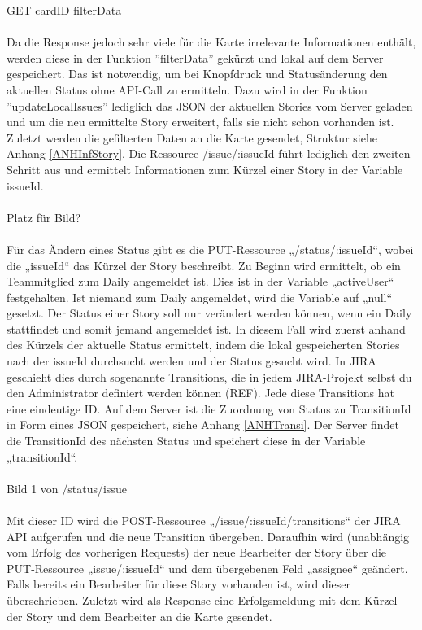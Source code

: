 \documentclass[12pt,titlepage]{scrartcl}
\begin{document}
			GET cardID filterData \\ \\
			Da die Response jedoch sehr viele für die Karte irrelevante Informationen enthält, werden diese in der Funktion ''filterData'' gekürzt und lokal auf dem Server gespeichert. Das ist notwendig, um bei Knopfdruck und Statusänderung den aktuellen Status ohne API-Call zu ermitteln. Dazu wird in der Funktion ''updateLocalIssues'' lediglich das JSON der aktuellen Stories vom Server geladen und um die neu ermittelte Story erweitert, falls sie nicht schon vorhanden ist. Zuletzt werden die gefilterten Daten an die Karte gesendet, Struktur siehe Anhang \ref{ANHInfStory}. Die Ressource /issue/:issueId führt lediglich den zweiten Schritt aus und ermittelt Informationen zum Kürzel einer Story in der Variable issueId. \\ \\
			Platz für Bild? \\ \\
			Für das Ändern eines Status gibt es die PUT-Ressource „/status/:issueId“, wobei die „issueId“ das Kürzel der Story beschreibt. Zu Beginn wird ermittelt, ob ein Teammitglied zum Daily angemeldet ist. Dies ist in der Variable „activeUser“ festgehalten. Ist niemand zum Daily angemeldet, wird die Variable auf „null“ gesetzt. Der Status einer Story soll nur verändert werden können, wenn ein Daily stattfindet und somit jemand angemeldet ist. In diesem Fall wird zuerst anhand des Kürzels der aktuelle Status ermittelt, indem die lokal gespeicherten Stories nach der issueId durchsucht werden und der Status gesucht wird. In JIRA geschieht dies durch sogenannte Transitions, die in jedem JIRA-Projekt selbst du den Administrator definiert werden können (REF). Jede diese Transitions hat eine eindeutige ID. Auf dem Server ist die Zuordnung von Status zu TransitionId in Form eines JSON gespeichert, siehe Anhang \ref{ANHTransi}. Der Server findet die TransitionId des nächsten Status und speichert diese in der Variable „transitionId“. \\ \\
			Bild 1 von /status/issue \\ \\
			Mit dieser ID wird die POST-Ressource „/issue/:issueId/transitions“ der JIRA API aufgerufen und die neue Transition übergeben. Daraufhin wird (unabhängig vom Erfolg des vorherigen Requests) der neue Bearbeiter der Story über die PUT-Ressource „issue/:issueId“ und dem übergebenen Feld „assignee“ geändert. Falls bereits ein Bearbeiter für diese Story vorhanden ist, wird dieser überschrieben. Zuletzt wird als Response eine Erfolgsmeldung mit dem Kürzel der Story und dem Bearbeiter an die Karte gesendet. \\ \\
\end{document}
